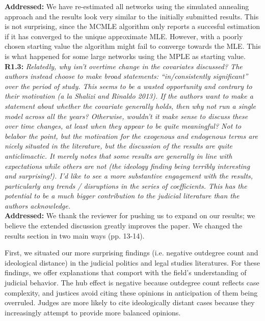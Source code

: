 \documentclass[a4paper,11pt]{texMemo}
\begin{document}
\noindent \textbf{Addressed:} We have re-estimated all networks using the simulated annealing approach and the results look very similar to the initially submitted results. This is not surprising, since the MCMLE algorithm only reports a succesful estimation if it has converged to the unique approximate MLE. However, with a poorly chosen starting value the algorithm might fail to converge towards the MLE. This is what happened for some large networks using the MPLE as starting value.  \\

\noindent \textbf{R1.3:} \emph{ Relatedly, why isn’t overtime change in the covariates discussed? The authors instead choose to make broad statements: “in/consistently significant” over the period of study.  This seems to be a wasted opportunity and contrary to their motivation (a la Shalizi and Rinaldo 2013). If the authors want to make a statement about whether the covariate generally holds, then why not run a single model across all the years? Otherwise, wouldn’t it make sense to discuss these over time changes, at least when they appear to be quite meaningful? Not to belabor the point, but the motivation for the exogenous and endogenous terms are nicely situated in the literature, but the discussion of the results are quite anticlimactic. It merely notes that some results are generally in line with expectations while others are not (the ideology finding being terribly interesting and surprising!). I’d like to see a more substantive engagement with the results, particularly any trends / disruptions in the series of coefficients. This has the potential to be a much bigger contribution to the judicial literature than the authors acknowledge. }\\


\noindent \textbf{Addressed:} We thank the reviewer for pushing us to expand on our results; we believe the extended discussion greatly improves the paper. We changed the results section in two main ways (pp. 13-14). 

First, we situated our more surprising findings (i.e. negative outdegree count and ideological distance) in the judicial politics and legal studies literatures. For these findings, we offer explanations that comport with the field's understanding of judicial behavior. The hub effect is negative because outdegree count reflects case complexity, and justices avoid citing these opinions in anticipation of them being overruled. Judges are more likely to cite ideologically distant cases because they increasingly attempt to provide more balanced opinions.
\end{document}
